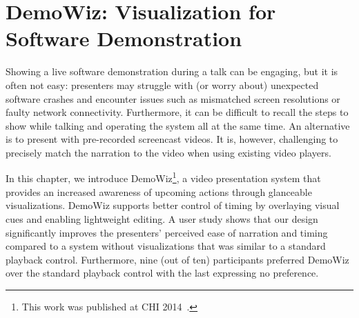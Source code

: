 \chapter{DemoWiz: Visualization for Software Demonstration}
\label{chapter_demowiz}

Showing a live software demonstration during a talk can be engaging, but it is often not easy: presenters may struggle with (or worry about) unexpected software crashes and encounter issues such as mismatched screen resolutions or faulty network connectivity. Furthermore, it can be difficult to recall the steps to show while talking and operating the system all at the same time. An alternative is to present with pre-recorded screencast videos. It is, however, challenging to precisely match the narration to the video when using existing video players.

In this chapter, we introduce DemoWiz\footnote{This work was published at CHI 2014~\cite{Chi:2014:DRS:2556288.2557254}.}, a video presentation system that provides an increased awareness of upcoming actions through glanceable visualizations. DemoWiz supports better control of timing by overlaying visual cues and enabling lightweight editing. A user study shows that our design significantly improves the presenters’ perceived ease of narration and timing compared to a system without visualizations that was similar to a standard playback control. Furthermore, nine (out of ten) participants preferred DemoWiz over the standard playback control with the last expressing no preference.








